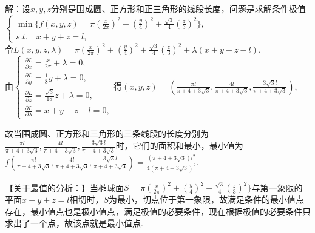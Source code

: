 \documentclass[12pt,UTF8]{ctexart}
\begin{document}
\begin{enumerate}
解：设$x,y,z$分别是围成圆、正方形和正三角形的线段长度，问题是求解条件极值\\
$\begin{cases}
\min\{f(x,y,z)=\pi(\frac x{2\pi})^2+(\frac y4)^2+\frac{\sqrt3}4(\frac z3)^2\},\\
s.t.\quad x+y+z=l,
\end{cases}$\\
令$L(x,y,z,\lambda)=\pi(\frac x{2\pi})^2+(\frac y4)^2+\frac{\sqrt3}4(\frac z3)^2+\lambda(x+y+z-l)$,\\
由$\begin{cases}
\frac{\partial L}{\partial x}=\frac x{2\pi}+\lambda=0,\\
\frac{\partial L}{\partial y}=\frac18y+\lambda=0,\\
\frac{\partial L}{\partial z}=\frac{\sqrt3}{18}z+\lambda=0,\\
\frac{\partial L}{\partial\lambda}=x+y+z-l=0,
\end{cases}$得$(x,y,z)=(\frac{\pi l}{\pi+4+3\sqrt3},\frac{4l}{\pi+4+3\sqrt3},\frac{3\sqrt3l}{\pi+4+3\sqrt3})$,

故当围成圆、正方形和三角形的三条线段的长度分别为$\frac{\pi l}{\pi+4+3\sqrt3},\frac{4l}{\pi+4+3\sqrt3},\frac{3\sqrt3l}{\pi+4+3\sqrt3}$时，它们的面积和最小，最小值为$f(\frac{\pi l}{\pi+4+3\sqrt3},\frac{4l}{\pi+4+3\sqrt3},\frac{3\sqrt3l}{\pi+4+3\sqrt3})=\frac{(\pi+4+3\sqrt3)l^2}{4(\pi+4+3\sqrt3)^2}$.

【关于最值的分析：】当椭球面$S=\pi(\frac x{2\pi})^2+(\frac y4)^2+\frac{\sqrt3}4(\frac z3)^2\}$与第一象限的平面$x+y+z=l$相切时，$S$为最小，切点位于第一象限，故满足条件的最小值点存在，最小值点也是极小值点，满足极值的必要条件，现在根据极值的必要条件只求出了一个点，故该点就是最小值点. 
\end{enumerate}
\end{document}
